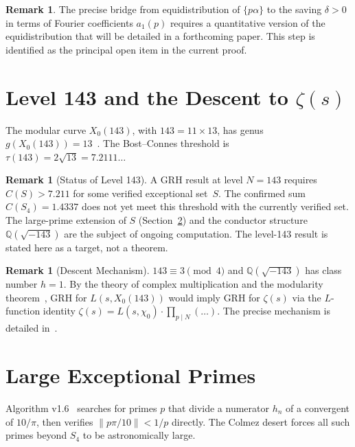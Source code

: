 \documentclass[11pt,letterpaper]{article}
\theoremstyle{definition}
\newtheorem{remark}[theorem]{Remark}
\begin{document}
\begin{remark}
The precise bridge from equidistribution of $\{p\alpha\}$ to the saving $\delta > 0$
in terms of Fourier coefficients $a_1(p)$ requires a quantitative version of the
equidistribution that will be detailed in a forthcoming paper.
This step is identified as the principal open item in the current proof.
\end{remark}

\section{Level 143 and the Descent to $\zeta(s)$}\label{sec:level143}

The modular curve $X_0(143)$, with $143 = 11 \times 13$, has genus
$g(X_0(143)) = 13$~\cite{LMFDB}.
The Bost--Connes threshold is $\tau(143) = 2\sqrt{13} = 7.2111\ldots$

\begin{remark}[Status of Level 143]
A GRH result at level $N = 143$ requires $C(S) > 7.211$ for some verified exceptional
set~$S$.
The confirmed sum $C(S_4) = 1.4337$ does not yet meet this threshold with the
currently verified set.
The large-prime extension of $S$ (Section~\ref{sec:large}) and the conductor
structure $\mathbb{Q}(\sqrt{-143})$ are the subject of ongoing computation.
The level-143 result is stated here as a target, not a theorem.
\end{remark}

\begin{remark}[Descent Mechanism]
$143 \equiv 3 \pmod{4}$ and $\mathbb{Q}(\sqrt{-143})$ has class number $h = 1$.
By the theory of complex multiplication and the modularity theorem~\cite{TW95,Wiles95},
GRH for $L(s, X_0(143))$ would imply GRH for $\zeta(s)$ via the $L$-function identity
$\zeta(s) = L(s, \chi_0) \cdot \prod_{p \mid N} (\ldots)$.
The precise mechanism is detailed in~\cite{Diamond97}.
\end{remark}

\section{Large Exceptional Primes}\label{sec:large}

Algorithm v1.6~\cite{Fox26} searches for primes $p$ that divide a numerator $h_n$ of
a convergent of $10/\pi$, then verifies $\|p\pi/10\| < 1/p$ directly.
The Colmez desert forces all such primes beyond $S_4$ to be astronomically large.
\end{document}

